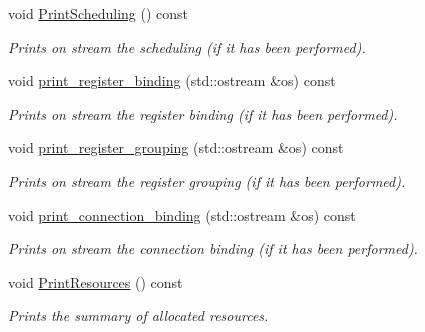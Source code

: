 \begin{DoxyCompactItemize}
void \hyperlink{classhls_a2e962663a506e65c616c38044f1fcd66}{Print\+Scheduling} () const
\begin{DoxyCompactList}\small\item\em Prints on stream the scheduling (if it has been performed). \end{DoxyCompactList}\item 
void \hyperlink{classhls_af6e8c0fb3d03ffde89044c215a6afc8e}{print\+\_\+register\+\_\+binding} (std\+::ostream \&os) const
\begin{DoxyCompactList}\small\item\em Prints on stream the register binding (if it has been performed). \end{DoxyCompactList}\item 
void \hyperlink{classhls_ade13876660ef2da09f930f9c3243d138}{print\+\_\+register\+\_\+grouping} (std\+::ostream \&os) const
\begin{DoxyCompactList}\small\item\em Prints on stream the register grouping (if it has been performed). \end{DoxyCompactList}\item 
void \hyperlink{classhls_aaafdd94ce75cb9c8cef85be61101b239}{print\+\_\+connection\+\_\+binding} (std\+::ostream \&os) const
\begin{DoxyCompactList}\small\item\em Prints on stream the connection binding (if it has been performed). \end{DoxyCompactList}\item 
void \hyperlink{classhls_ac9ec57688c391652f3788021ce09ced2}{Print\+Resources} () const
\begin{DoxyCompactList}\small\item\em Prints the summary of allocated resources. \end{DoxyCompactList}\end{DoxyCompactItemize}
